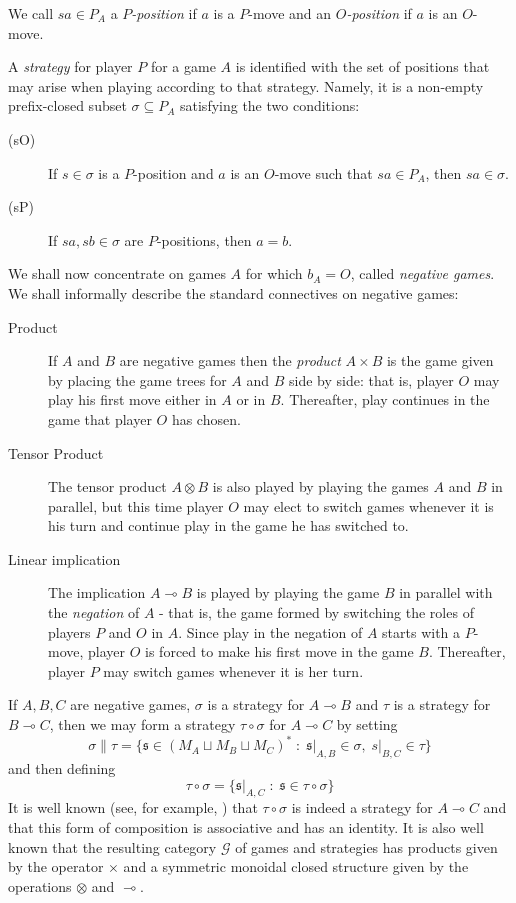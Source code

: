 \documentclass[a4paper,UKenglish]{lipics-v2016}
\theoremstyle{plain}
\theoremstyle{definition}
\newcommand{\tensor}{\otimes}
\renewcommand{\implies}{\multimap}
\newcommand{\comp}[2]{#1 \circ #2}
\newcommand{\cprd}{\sqcup}
\newcommand{\G}{\mathcal G}
\newcommand{\suchthat}{\;\colon\;}
\renewcommand{\subset}{\subseteq}
\newcommand{\s}{\mathfrak{s}}
\begin{document}
We call $sa\in P_A$ a \emph{$P$-position} if $a$ is a $P$-move and an \emph{$O$-position} if $a$ is an $O$-move.

A \emph{strategy} for player $P$ for a game $A$ is identified with the set of positions that may arise when playing according to that strategy.  Namely, it is a non-empty prefix-closed subset $\sigma\subset P_A$ satisfying the two conditions:
\begin{description}
  \item[(sO)] If $s\in\sigma$ is a $P$-position and $a$ is an $O$-move such that $sa\in P_A$, then $sa\in\sigma$.
  \item[(sP)] If $sa,sb\in\sigma$ are $P$-positions, then $a=b$.
\end{description}

We shall now concentrate on games $A$ for which $b_A=O$, called \emph{negative games}.  We shall informally describe the standard connectives on negative games:

\begin{description}
  \item[Product] If $A$ and $B$ are negative games then the \emph{product} $A\times B$ is the game given by placing the game trees for $A$ and $B$ side by side: that is, player $O$ may play his first move either in $A$ or in $B$.  Thereafter, play continues in the game that player $O$ has chosen.
  \item[Tensor Product] The tensor product $A\tensor B$ is also played by playing the games $A$ and $B$ in parallel, but this time player $O$ may elect to switch games whenever it is his turn and continue play in the game he has switched to.
  \item[Linear implication] The implication $A\implies B$ is played by playing the game $B$ in parallel with the \emph{negation} of $A$ - that is, the game formed by switching the roles of players $P$ and $O$ in $A$.  Since play in the negation of $A$ starts with a $P$-move, player $O$ is forced to make his first move in the game $B$.  Thereafter, player $P$ may switch games whenever it is her turn.
\end{description}

If $A,B,C$ are negative games, $\sigma$ is a strategy for $A\implies B$ and $\tau$ is a strategy for $B\implies C$, then we may form a strategy $\comp\tau\sigma$ for $A\implies C$ by setting
\[
  \sigma\|\tau = \{\s\in (M_A\cprd M_B\cprd M_C)^*\suchthat \s\vert_{A,B}\in\sigma,\;s\vert_{B,C}\in\tau\}
  \]
and then defining
\[
  \comp\tau\sigma = \{\s\vert_{A,C}\suchthat\s\in\comp\tau\sigma\}
  \]
It is well known (see, for example, \cite{abramskyjagadeesangames}) that $\comp\tau\sigma$ is indeed a strategy for $A\implies C$ and that this form of composition is associative and has an identity.  It is also well known that the resulting category $\G$ of games and strategies has products given by the operator $\times$ and a symmetric monoidal closed structure given by the operations $\tensor$ and $\implies$.  
\end{document}
